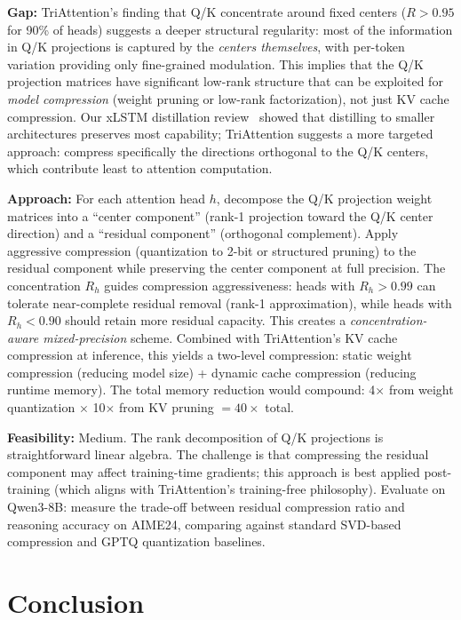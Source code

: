 \documentclass[11pt]{article}
\begin{document}
\textbf{Gap:} TriAttention's finding that Q/K concentrate around fixed centers ($R > 0.95$ for 90\% of heads) suggests a deeper structural regularity: most of the information in Q/K projections is captured by the \textit{centers themselves}, with per-token variation providing only fine-grained modulation. This implies that the Q/K projection matrices have significant low-rank structure that can be exploited for \textit{model compression} (weight pruning or low-rank factorization), not just KV cache compression. Our xLSTM distillation review~\cite{xlstm} showed that distilling to smaller architectures preserves most capability; TriAttention suggests a more targeted approach: compress specifically the directions orthogonal to the Q/K centers, which contribute least to attention computation.

\textbf{Approach:} For each attention head $h$, decompose the Q/K projection weight matrices into a ``center component'' (rank-1 projection toward the Q/K center direction) and a ``residual component'' (orthogonal complement). Apply aggressive compression (quantization to 2-bit or structured pruning) to the residual component while preserving the center component at full precision. The concentration $R_h$ guides compression aggressiveness: heads with $R_h > 0.99$ can tolerate near-complete residual removal (rank-1 approximation), while heads with $R_h < 0.90$ should retain more residual capacity. This creates a \textit{concentration-aware mixed-precision} scheme. Combined with TriAttention's KV cache compression at inference, this yields a two-level compression: static weight compression (reducing model size) + dynamic cache compression (reducing runtime memory). The total memory reduction would compound: 4$\times$ from weight quantization $\times$ 10$\times$ from KV pruning $= 40\times$ total.

\textbf{Feasibility:} Medium. The rank decomposition of Q/K projections is straightforward linear algebra. The challenge is that compressing the residual component may affect training-time gradients; this approach is best applied post-training (which aligns with TriAttention's training-free philosophy). Evaluate on Qwen3-8B: measure the trade-off between residual compression ratio and reasoning accuracy on AIME24, comparing against standard SVD-based compression and GPTQ quantization baselines.

\section{Conclusion}
\end{document}

